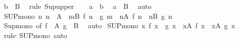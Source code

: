 \begin{isabellebody}
\ {\isachardoublequoteopen}b\ {\isasymle}\ {\isasymSqunion}B{\isachardoublequoteclose}\ \isamarkupfalse%
\ {\isacharparenleft}{\kern0pt}rule\ Sup{\isacharunderscore}{\kern0pt}upper{\isacharparenright}{\kern0pt}\isanewline
\ \ \isamarkupfalse%
\ {\isacartoucheopen}a\ {\isasymle}\ b{\isacartoucheclose}\ \isamarkupfalse%
\ {\isachardoublequoteopen}a\ {\isasymle}\ {\isasymSqunion}B{\isachardoublequoteclose}\ \isamarkupfalse%
\ auto\isanewline
{}\isamarkupfalse%
%
\endisatagproof
{\isafoldproof}%
%
\isadelimproof
\isanewline
%
\endisadelimproof
\isanewline
{}\isamarkupfalse%
\ SUP{\isacharunderscore}{\kern0pt}mono{\isacharcolon}{\kern0pt}\ {\isachardoublequoteopen}{\isacharparenleft}{\kern0pt}{\isasymAnd}n{\isachardot}{\kern0pt}\ n\ {\isasymin}\ A\ {\isasymLongrightarrow}\ {\isasymexists}m{\isasymin}B{\isachardot}{\kern0pt}\ f\ n\ {\isasymle}\ g\ m{\isacharparenright}{\kern0pt}\ {\isasymLongrightarrow}\ {\isacharparenleft}{\kern0pt}{\isasymSqunion}n{\isasymin}A{\isachardot}{\kern0pt}\ f\ n{\isacharparenright}{\kern0pt}\ {\isasymle}\ {\isacharparenleft}{\kern0pt}{\isasymSqunion}n{\isasymin}B{\isachardot}{\kern0pt}\ g\ n{\isacharparenright}{\kern0pt}{\isachardoublequoteclose}\isanewline
%
\isadelimproof
\ \ %
\endisadelimproof
%
\isatagproof
{}\isamarkupfalse%
\ Sup{\isacharunderscore}{\kern0pt}mono\ {\isacharbrackleft}{\kern0pt}of\ {\isachardoublequoteopen}f\ {\isacharbackquote}{\kern0pt}\ A{\isachardoublequoteclose}\ {\isachardoublequoteopen}g\ {\isacharbackquote}{\kern0pt}\ B{\isachardoublequoteclose}{\isacharbrackright}{\kern0pt}\ \isamarkupfalse%
\ auto%
\endisatagproof
{\isafoldproof}%
%
\isadelimproof
\isanewline
%
\endisadelimproof
\isanewline
{}\isamarkupfalse%
\ SUP{\isacharunderscore}{\kern0pt}mono{\isacharprime}{\kern0pt}{\isacharcolon}{\kern0pt}\ {\isachardoublequoteopen}{\isacharparenleft}{\kern0pt}{\isasymAnd}x{\isachardot}{\kern0pt}\ f\ x\ {\isasymle}\ g\ x{\isacharparenright}{\kern0pt}\ {\isasymLongrightarrow}\ {\isacharparenleft}{\kern0pt}{\isasymSqunion}x{\isasymin}A{\isachardot}{\kern0pt}\ f\ x{\isacharparenright}{\kern0pt}\ {\isasymle}\ {\isacharparenleft}{\kern0pt}{\isasymSqunion}x{\isasymin}A{\isachardot}{\kern0pt}\ g\ x{\isacharparenright}{\kern0pt}{\isachardoublequoteclose}\isanewline
%
\isadelimproof
\ \ %
\endisadelimproof
%
\isatagproof
{}\isamarkupfalse%
\ {\isacharparenleft}{\kern0pt}rule\ SUP{\isacharunderscore}{\kern0pt}mono{\isacharparenright}{\kern0pt}\ auto%
\endisatagproof
{\isafoldproof}%

\end{isabellebody}
